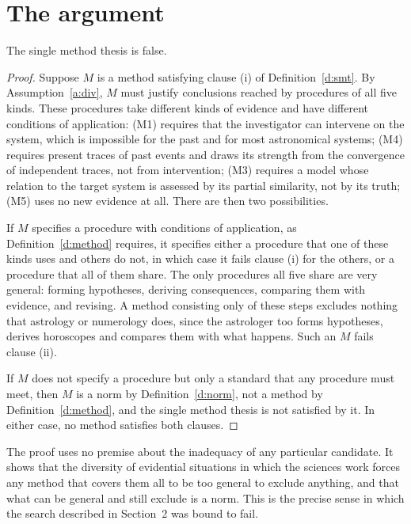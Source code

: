 \documentclass{situationist-preprint}
\begin{document}
\section{The argument}

\begin{proposition}\label{p:nosingle}
The single method thesis is false.
\end{proposition}

\begin{proof}
Suppose $M$ is a method satisfying clause (i) of Definition~\ref{d:smt}. By Assumption~\ref{a:div}, $M$ must justify conclusions reached by procedures of all five kinds. These procedures take different kinds of evidence and have different conditions of application: (M1) requires that the investigator can intervene on the system, which is impossible for the past and for most astronomical systems; (M4) requires present traces of past events and draws its strength from the convergence of independent traces, not from intervention; (M3) requires a model whose relation to the target system is assessed by its partial similarity, not by its truth; (M5) uses no new evidence at all. There are then two possibilities.

If $M$ specifies a procedure with conditions of application, as Definition~\ref{d:method} requires, it specifies either a procedure that one of these kinds uses and others do not, in which case it fails clause (i) for the others, or a procedure that all of them share. The only procedures all five share are very general: forming hypotheses, deriving consequences, comparing them with evidence, and revising. A method consisting only of these steps excludes nothing that astrology or numerology does, since the astrologer too forms hypotheses, derives horoscopes and compares them with what happens. Such an $M$ fails clause (ii).

If $M$ does not specify a procedure but only a standard that any procedure must meet, then $M$ is a norm by Definition~\ref{d:norm}, not a method by Definition~\ref{d:method}, and the single method thesis is not satisfied by it. In either case, no method satisfies both clauses.
\end{proof}

The proof uses no premise about the inadequacy of any particular candidate. It shows that the diversity of evidential situations in which the sciences work forces any method that covers them all to be too general to exclude anything, and that what can be general and still exclude is a norm. This is the precise sense in which the search described in Section~2 was bound to fail.
\end{document}
